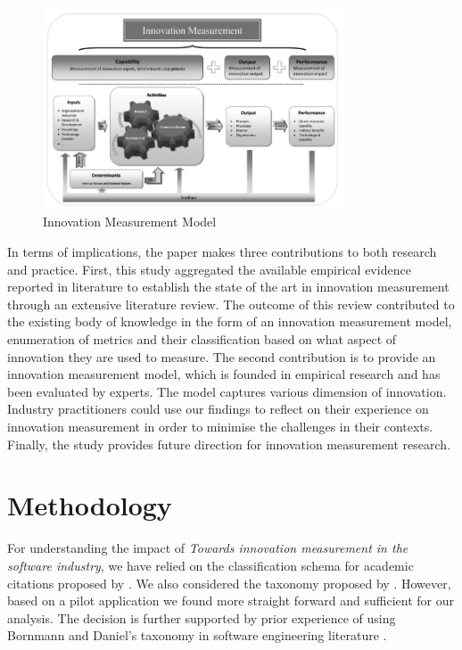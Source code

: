\documentclass[sigplan]{acmart}
\newcommand{\theArticle}{\textit{Towards innovation measurement in the software industry}}
\begin{document}
\begin{figure}[!ht]
\includegraphics[width=0.8\textwidth]{Figures/im_model}
\caption{Innovation Measurement Model}
\label{fig:im_model}
\end{figure}

In terms of implications, the paper makes three contributions to both research and practice. First, this study aggregated the available empirical evidence reported in literature to establish the state of the art in innovation measurement through an extensive literature review. The outcome of this review contributed to the existing body of knowledge in the form of an innovation measurement model, enumeration of metrics and their classification based on what aspect of innovation they are used to measure. The second contribution is to provide an innovation measurement model, which is founded in empirical research and has been evaluated by experts. The model captures various dimension of innovation. Industry practitioners could use our findings to reflect on their experience on innovation measurement in order to minimise the challenges in their contexts. Finally, the study provides future direction for innovation measurement research.



\section{Methodology}\label{sec:method} 
For understanding the impact of \theArticle, we have relied on the classification schema for academic citations proposed by \citet{teufel2006annotation}. We also considered the taxonomy proposed by \citet{bornmann2008citation}. However, based on a pilot application we found \citet{teufel2006annotation} more straight forward and sufficient for our analysis. The decision is further supported by prior experience of using Bornmann and Daniel's taxonomy in software engineering literature \cite{poulding2015using}.
\end{document}
